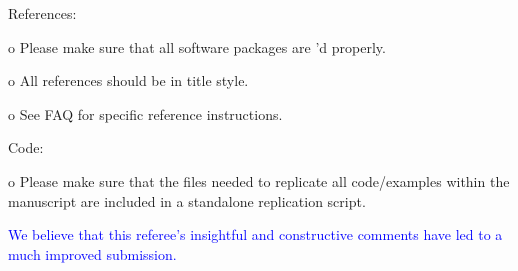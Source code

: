 \documentclass[12pt]{article}
\begin{document}
References:



o Please make sure that all software packages are \cite{}'d properly.

o All references should be in title style.

o See FAQ for specific reference instructions.


Code:

o Please make sure that the files needed to replicate all
code/examples within the manuscript are included in a standalone
replication script.


\textcolor{blue}{We believe that this referee's insightful and
  constructive comments have led to a much improved submission.}
\end{document}
